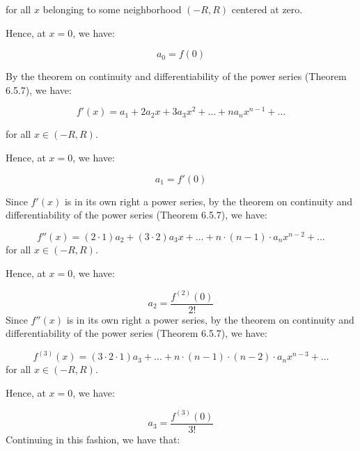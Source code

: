 \documentclass[10pt]{article}
\begin{document}
for all $\displaystyle x$ belonging to some neighborhood $\displaystyle ( -R,R)$ centered at zero.



Hence, at $\displaystyle x=0$, we have:


\begin{equation*}
a_{0} =f( 0)
\end{equation*}


By the theorem on continuity and differentiability of the power series (Theorem 6.5.7), we have:


\begin{equation*}
f'( x) =a_{1} +2a_{2} x+3a_{3} x^{2} +\dotsc +na_{n} x^{n-1} +\dotsc 
\end{equation*}


for all $\displaystyle x\in ( -R,R)$.



Hence, at $\displaystyle x=0$, we have:


\begin{equation*}
a_{1} =f'( 0)
\end{equation*}


Since $\displaystyle f'( x)$ is in its own right a power series, by the theorem on continuity and differentiability of the power series (Theorem 6.5.7), we have:


\begin{equation*}
f''( x) =( 2\cdot 1) a_{2} +( 3\cdot 2) a_{3} x+\dotsc +n\cdot ( n-1) \cdot a_{n} x^{n-2} +\dotsc 
\end{equation*}
for all $\displaystyle x\in ( -R,R)$.



Hence, at $\displaystyle x=0$, we have:


\begin{equation*}
a_{2} =\frac{f^{( 2)}( 0)}{2!}
\end{equation*}
Since $\displaystyle f''( x)$ is in its own right a power series, by the theorem on continuity and differentiability of the power series (Theorem 6.5.7), we have:


\begin{equation*}
f^{( 3)}( x) =( 3\cdot 2\cdot 1) a_{3} +\dotsc +n\cdot ( n-1) \cdot ( n-2) \cdot a_{n} x^{n-3} +\dotsc 
\end{equation*}
for all $\displaystyle x\in ( -R,R)$.



Hence, at $\displaystyle x=0$, we have:


\begin{equation*}
a_{3} =\frac{f^{( 3)}( 0)}{3!}
\end{equation*}
Continuing in this fashion, we have that:
\end{document}
